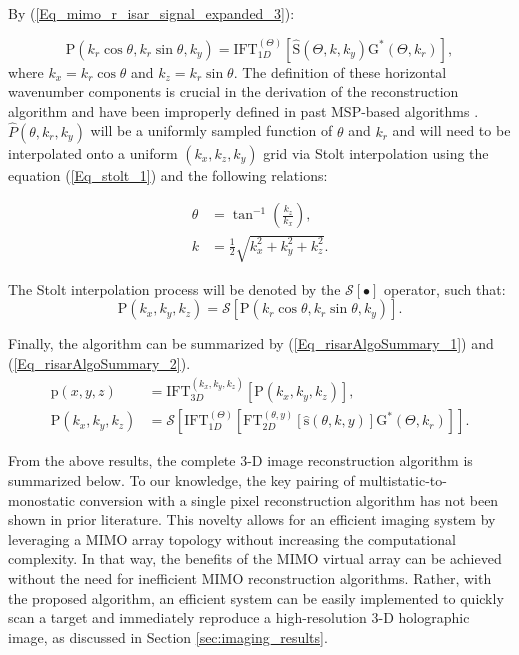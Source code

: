 \documentclass[conference]{IEEEtran}
\begin{document}
		By (\ref{Eq_mimo_r_isar_signal_expanded_3}):
		
		\begin{equation}
		\text{P}(k_r \cos\theta,k_r \sin\theta,k_y) = \text{IFT}_{1D}^{(\Theta)}\left[ \hat{\text{S}}(\Theta,k,k_y)\text{G}^*(\Theta,k_r) \right],
		\end{equation}
		where $k_x = k_r \cos\theta$ and $k_z = k_r \sin\theta$. The definition of these horizontal wavenumber components is crucial in the derivation of the reconstruction algorithm and have been improperly defined in past MSP-based algorithms \cite{Sheen:CSARPatent}. $\hat{P}(\theta,k_r,k_y)$ will be a uniformly sampled function of $\theta$ and $k_r$ and will need to be interpolated onto a uniform $(k_x,k_z,k_y)$ grid via Stolt interpolation using the equation (\ref{Eq_stolt_1}) and the following relations:
		
		\begin{align}
		\label{Eq_stolt_2}
		\theta &= \tan^{-1}\left(\frac{k_z}{k_x}\right), \\
		\label{Eq_stolt_3}
		k &= \frac{1}{2}\sqrt{k_x^2 + k_y^2 + k_z^2}.
		\end{align}
		
		The Stolt interpolation process will be denoted by the $\mathcal{S}[\bullet]$ operator, such that:
		\begin{equation}
		\text{P}(k_x,k_y,k_z) = \mathcal{S}[\text{P}(k_r \cos\theta,k_r \sin\theta,k_y)].
		\end{equation}
		
		Finally, the algorithm can be summarized by (\ref{Eq_risarAlgoSummary_1}) and (\ref{Eq_risarAlgoSummary_2}).
		\begin{align}
		\label{Eq_risarAlgoSummary_1}
		\text{p}(x,y,z) &= \text{IFT}_{3D}^{(k_x,k_y,k_z)}\left[ \text{P}(k_x,k_y,k_z) \right], \\
		\label{Eq_risarAlgoSummary_2}
		\text{P}(k_x,k_y,k_z) &= \mathcal{S}\left[\text{IFT}_{1D}^{(\Theta)}\left[ \text{FT}_{2D}^{(\theta,y)}\left[\hat{\text{s}}(\theta,k,y)\right]\text{G}^*(\Theta,k_r)\right]\right].
		\end{align}
		
		From the above results, the complete 3-D image reconstruction algorithm is summarized below. To our knowledge, the key pairing of multistatic-to-monostatic conversion with a single pixel reconstruction algorithm has not been shown in prior literature. This novelty allows for an efficient imaging system by leveraging a MIMO array topology without increasing the computational complexity. In that way, the benefits of the MIMO virtual array can be achieved without the need for inefficient MIMO reconstruction algorithms. Rather, with the proposed algorithm, an efficient system can be easily implemented to quickly scan a target and immediately reproduce a high-resolution 3-D holographic image, as discussed in Section \ref{sec:imaging_results}.
		
\end{document}
